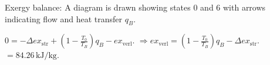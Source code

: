 Exergy balance:  
A diagram is drawn showing states 0 and 6 with arrows indicating flow and heat transfer \( q_B \).  

\( 0 = -\Delta ex_{\text{str}} + \left( 1 - \frac{T_0}{T_B} \right) q_B - ex_{\text{verl}} \).  
\( \Rightarrow ex_{\text{verl}} = \left( 1 - \frac{T_0}{T_B} \right) q_B - \Delta ex_{\text{str}} \).  
\( = 84.26 \, \text{kJ/kg} \).